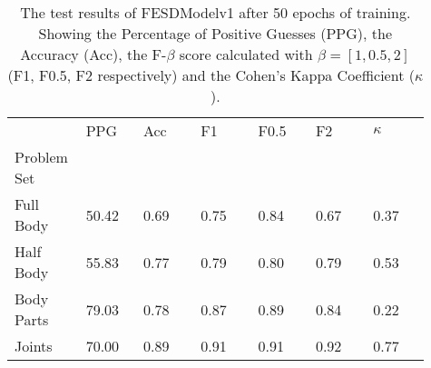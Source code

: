     \begin{table}[!htbp]
        \caption[Test Results of FESDModelv1]{The test results of FESDModelv1 after 50 epochs of training. Showing the Percentage of Positive Guesses (PPG), the Accuracy (Acc), the F-$\beta$ score calculated with $\beta = [1, 0.5, 2]$ (F1, F0.5, F2 respectively) and the Cohen's Kappa Coefficient ($\kappa$).}
        \label{tab:res_v1}
        \begin{tabular}{p{0.13\linewidth}p{0.13\linewidth}p{0.13\linewidth}p{0.13\linewidth}p{0.13\linewidth}p{0.13\linewidth}p{0.13\linewidth}}
\hline
{} &   PPG &  Acc &   F1 &  F0.5 &   F2 &  $\kappa$ \\
Problem Set   &       &      &      &       &      &           \\
\hline
Full Body  & 50.42 & 0.69 & 0.75 &  0.84 & 0.67 &      0.37 \\
Half Body  & 55.83 & 0.77 & 0.79 &  0.80 & 0.79 &      0.53 \\
Body Parts & 79.03 & 0.78 & 0.87 &  0.89 & 0.84 &      0.22 \\
Joints     & 70.00 & 0.89 & 0.91 &  0.91 & 0.92 &      0.77 \\
\hline
\end{tabular}

    \end{table}
  